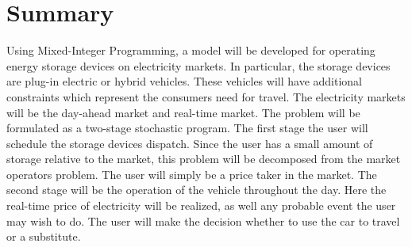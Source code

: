 \section*{Summary}

Using Mixed-Integer Programming, a model will be developed for operating energy storage devices on electricity markets.  In particular, the storage devices are plug-in electric or hybrid vehicles.  These vehicles will have additional constraints which represent the consumers need for travel.  The electricity markets will be the day-ahead market and real-time market.  The problem will be formulated as a two-stage stochastic program.  The first stage the user will schedule the storage devices dispatch.  Since the user has a small amount of storage relative to the market, this problem will be decomposed from the market operators problem.  The user will simply be a price taker in the market.  The second stage will be the operation of the vehicle throughout the day.  Here the real-time price of electricity will be realized, as well any probable event the user may wish to do.  The user will make the decision whether to use the car to travel or a substitute.
